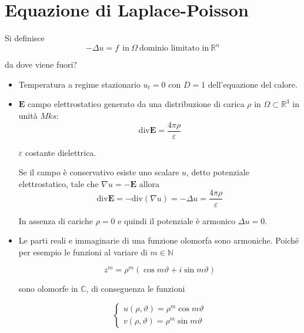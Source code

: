 \chapter{Equazione di Laplace-Poisson}

\begin{definition}
     Si definisce
    \begin{equation*}
        \boxed{-\Delta u=f} \ \ \text{in} \ \Omega \ \text{dominio limitato in} \ \mathbb{R}^{n}
    \end{equation*}
\end{definition}
da dove viene fuori?
\begin{itemize}
    \item Temperatura a regime stazionario $u_{t}=0$ con $D=1$ dell'equazione del calore.
    \item $\mathbf{E}$ campo elettrostatico generato da una distribuzione di carica $\rho $ in $\Omega \subset \mathbb{R}^{3}$ in unità $Mks$:
          \begin{equation*}
              \mathrm{div}\mathbf{E} =\frac{4\pi \rho }{\varepsilon }
          \end{equation*}

          $\varepsilon $ costante dielettrica.

          Se il campo è conservativo esiste uno scalare $u$, detto potenziale elettrostatico, tale che $\nabla u=-\mathbf{E}$ allora
          \begin{equation*}
              \mathrm{div}\mathbf{E} =-\mathrm{div}(\nabla u) =-\Delta u=\frac{4\pi \rho }{\varepsilon }
          \end{equation*}

          In assenza di cariche $\rho =0$ e quindi il potenziale è armonico $\Delta u=0$.
    \item Le parti reali e immaginarie di una funzione olomorfa sono armoniche. Poiché per esempio le funzioni al variare di $m\in \mathbb{N}$

          \begin{equation*}
              z^{m} =\rho ^{m}(\cos m\vartheta +i\sin m\vartheta)
          \end{equation*}

          sono olomorfe in $\mathbb{C}$, di conseguenza le funzioni

          \begin{equation*}
              \begin{cases}
                  u(\rho,\vartheta) =\rho ^{m}\cos m\vartheta \\
                  v(\rho,\vartheta) =\rho ^{m}\sin m\vartheta
              \end{cases}
          \end{equation*}


\end{itemize}
